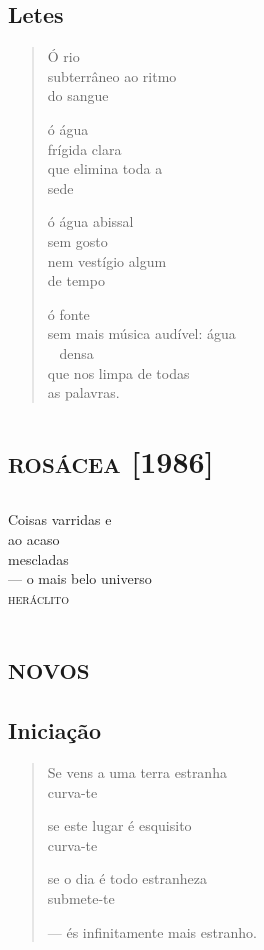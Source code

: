 \chapter{Letes}

\begin{verse}
Ó rio\\
subterrâneo ao ritmo\\
do sangue

ó água\\
frígida clara\\
que elimina toda a\\
sede

ó água abissal\\
sem gosto\\
nem vestígio algum\\
de tempo

ó fonte\\
sem mais música audível: água\\
\qquad\qquad\qquad\qquad\qquad\mbox{ } densa\\
que nos limpa de todas\\
as palavras.
\end{verse}

\part{\textsc{rosácea} {[}1986{]}}

\chapter*{}
\thispagestyle{empty}
\mbox{}
\vspace*{\fill}

\noindent{}Coisas varridas e\\
ao acaso\\
mescladas\\
--- o mais belo universo\\
\textsc{heráclito}
\vspace*{\fill}

\part*{\textsc{novos}}

\chapter{Iniciação}

\begin{verse}
Se vens a uma terra estranha\\
curva-te

se este lugar é esquisito\\
curva-te

se o dia é todo estranheza\\
submete-te

--- és infinitamente mais estranho.
\end{verse}

